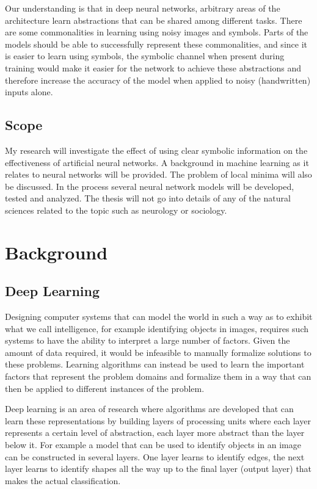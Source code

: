 \documentclass{article}
\begin{document}
	Our understanding is that in deep neural networks, arbitrary areas of the architecture learn abstractions that can be shared among different tasks\cite{Bengio:2009:LDA:1658423.1658424}. There are some commonalities in learning using noisy images and symbols. Parts of the models should be able to successfully represent these commonalities, and since it is easier to learn using symbols, the symbolic channel when present during training would make it easier for the network to achieve these abstractions and therefore increase the accuracy of the model when applied to noisy (handwritten) inputs alone.
	
	\subsection{Scope}
	
	My research will investigate the effect of using clear symbolic information on the effectiveness of artificial neural networks. A background in machine learning as it relates to neural networks will be provided. The problem of local minima will also be discussed. In the process several neural network models will be developed, tested and analyzed. The thesis will not go into details of any of the natural sciences related to the topic such as neurology or sociology.
	
	\section{Background}
	
	\subsection{Deep Learning}
	
	Designing computer systems that can model the world in such a way as to exhibit what we call intelligence, for example identifying objects in images, requires such systems to have the ability to interpret a large number of factors. Given the amount of data required, it would be infeasible to manually formalize solutions to these problems. Learning algorithms can instead be used to learn the important factors that represent the problem domains and formalize them in a way that can then be applied to different instances of the problem\cite{Bengio:2009:LDA:1658423.1658424}.
	
	Deep learning is an area of research where algorithms are developed that can learn these representations by building layers of processing units where each layer represents a certain level of abstraction, each layer more abstract than the layer below it\cite{Bengio:2009:LDA:1658423.1658424}. For example a model that can be used to identify objects in an image can be constructed in several layers. One layer learns to identify edges, the next layer learns to identify shapes all the way up to the final layer (output layer) that makes the actual classification.
	
\end{document}
